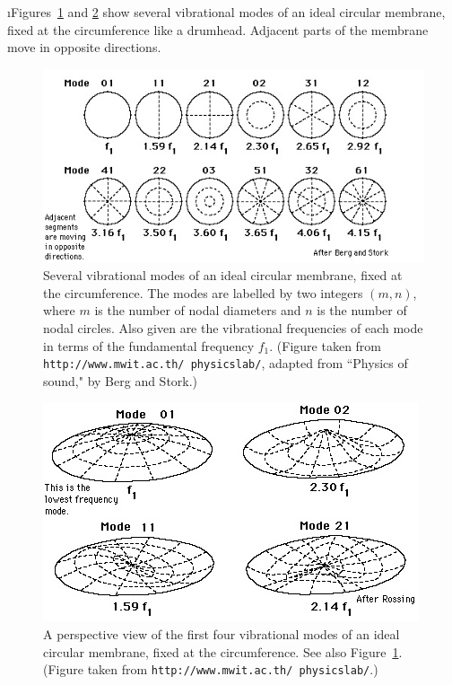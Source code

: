 \i Figures~\ref{f:membrane} and \ref{f:membrane2} 
show several vibrational modes of an
ideal circular membrane, fixed at the circumference
like a drumhead.
Adjacent parts of the membrane move in opposite
directions.
%
\begin{figure}[htbp]
\begin{center}
\includegraphics[width=.9\textwidth]{membrane.jpg}
\caption{
Several vibrational modes of an 
ideal circular membrane, fixed at the circumference.
The modes are labelled by two integers $(m,n)$,
where $m$ is the number of nodal diameters and
$n$ is the number of nodal circles.
Also given are the vibrational frequencies of
each mode in terms of the fundamental frequency $f_1$.
(Figure taken from 
{\tt http://www.mwit.ac.th/~physicslab/}, adapted
from ``Physics of sound," by Berg and Stork.)}
\label{f:membrane}
\end{center}
\end{figure}
%
\begin{figure}[htbp]
\begin{center}
\includegraphics[width=.7\textwidth]{membrane2.jpg}
\caption{A perspective view of the first 
four vibrational modes of an ideal circular
membrane, fixed at the circumference.
See also Figure~\ref{f:membrane}.
(Figure taken from 
{\tt http://www.mwit.ac.th/~physicslab/}.)}
\label{f:membrane2}
\end{center}
\end{figure}

